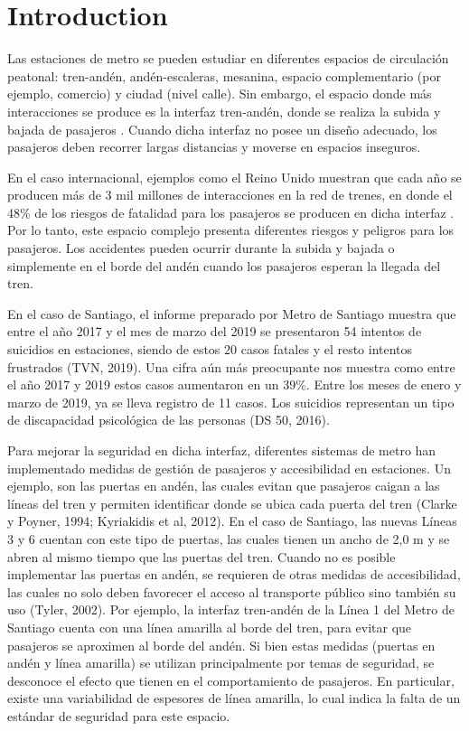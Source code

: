 \section{Introduction}
\label{sec:intro}
Las estaciones de metro se pueden estudiar en diferentes espacios de circulación peatonal: tren-andén, andén-escaleras, mesanina, espacio complementario (por ejemplo, comercio) y ciudad (nivel calle). Sin embargo, el espacio donde más interacciones se produce es la interfaz tren-andén, donde se realiza la subida y bajada de pasajeros \cite{seriani_fernandez}. Cuando dicha interfaz no posee un diseño adecuado, los pasajeros deben recorrer largas distancias y moverse en espacios inseguros.

En el caso internacional, ejemplos como el Reino Unido muestran que cada año se producen más de 3 mil millones de interacciones en la red de trenes, en donde el 48\% de los riesgos de fatalidad para los pasajeros se producen en dicha interfaz \cite{RSSB}. Por lo tanto, este espacio complejo presenta diferentes riesgos y peligros para los pasajeros. Los accidentes pueden ocurrir durante la subida y bajada o simplemente en el borde del andén cuando los pasajeros esperan la llegada del tren. 

En el caso de Santiago, el informe preparado por Metro de Santiago muestra que entre el año 2017 y el mes de marzo del 2019 se presentaron 54 intentos de suicidios en estaciones, siendo de estos 20 casos fatales y el resto intentos frustrados (TVN, 2019). Una cifra aún más preocupante nos muestra como entre el año 2017 y 2019 estos casos aumentaron en un 39\%. Entre los meses de enero y marzo de 2019, ya se lleva registro de 11 casos. Los suicidios representan un tipo de discapacidad psicológica de las personas (DS 50, 2016).

Para mejorar la seguridad en dicha interfaz, diferentes sistemas de metro han implementado medidas de gestión de pasajeros y accesibilidad en estaciones. Un ejemplo, son las puertas en andén, las cuales evitan que pasajeros caigan a las líneas del tren y permiten identificar donde se ubica cada puerta del tren (Clarke y Poyner, 1994; Kyriakidis et al, 2012). En el caso de Santiago, las nuevas Líneas 3 y 6 cuentan con este tipo de puertas, las cuales tienen un ancho de 2,0 m y se abren al mismo tiempo que las puertas del tren. Cuando no es posible implementar las puertas en andén, se requieren de otras medidas de accesibilidad, las cuales no solo deben favorecer el acceso al transporte público sino también su uso (Tyler, 2002). Por ejemplo, la interfaz tren-andén de la Línea 1 del Metro de Santiago cuenta con una línea amarilla al borde del tren, para evitar que pasajeros se aproximen al borde del andén. Si bien estas medidas (puertas en andén y línea amarilla) se utilizan principalmente por temas de seguridad, se desconoce el efecto que tienen en el comportamiento de pasajeros. En particular, existe una variabilidad de espesores de línea amarilla, lo cual indica la falta de un estándar de seguridad para este espacio.

